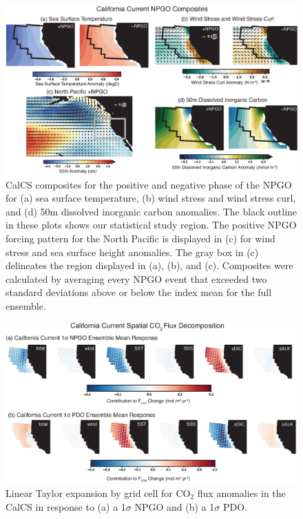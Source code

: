 \documentclass[]{article}
\title{}
\author{}
\date{}
\begin{document}
\renewcommand{\thefigure}{S\arabic{figure}}
\setcounter{figure}{0}

\begin{figure}[h]
	\centering
	\includegraphics[width=39pc]{figs/S3_CalCS_NPGO_composites.eps}
	\caption{CalCS composites for the positive and negative phase of the NPGO for (a) sea surface temperature, (b) wind stress and wind stress curl, and (d) 50m dissolved inorganic carbon anomalies. The black outline in these plots shows our statistical study region. The positive NPGO forcing pattern for the North Pacific is displayed in (c) for wind stress and sea surface height anomalies. The gray box in (c) delineates the region displayed in (a), (b), and (c). Composites were calculated by averaging every NPGO event that exceeded two standard deviations above or below the index mean for the full ensemble.}
\end{figure}

\newpage
\begin{figure}[h]
	\centering
	\includegraphics[width=39pc]{figs/S1_overhead_CO2_decomposition.eps}
	\caption{Linear Taylor expansion by grid cell for CO$_{2}$ flux anomalies in the CalCS in response to (a) a 1$\sigma$ NPGO and (b) a 1$\sigma$ PDO.}
\end{figure}
\end{document}
